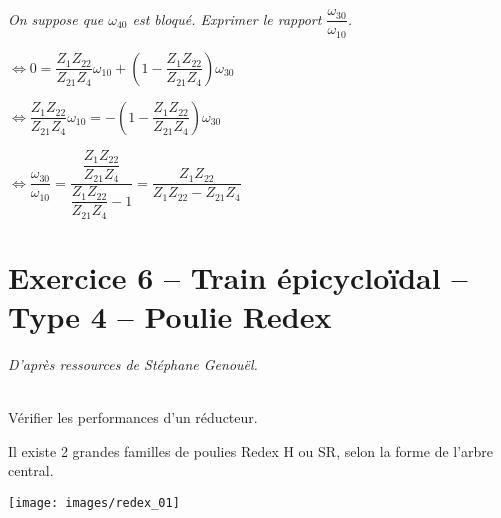 \documentclass[10pt,fleqn]{article} %
\begin{document}
\begin{multicols}{2}
\begin{multicols}{2}
\begin{corrige}
 \end{corrige}
 \else
 \fi
 
\subparagraph{}
\textit{On suppose que $\omega_{40}$ est bloqué. Exprimer le rapport $\dfrac{\omega_{30}}{\omega_{10}}$.}
\ifprof
 \begin{corrige}
 $\Leftrightarrow 0=\dfrac{Z_{1}Z_{22}}{Z_{21}Z_{4}}\omega_{10} +\left(1- \dfrac{Z_{1}Z_{22}}{Z_{21}Z_{4}}\right)\omega_{30}$

$\Leftrightarrow  \dfrac{Z_{1}Z_{22}}{Z_{21}Z_{4}}\omega_{10} =-\left(1- \dfrac{Z_{1}Z_{22}}{Z_{21}Z_{4}}\right)\omega_{30}$

$\Leftrightarrow  \dfrac{\omega_{30}}{\omega_{10}} = \dfrac{ \dfrac{Z_{1}Z_{22}}{Z_{21}Z_{4}}}{ \dfrac{Z_{1}Z_{22}}{Z_{21}Z_{4}}-1}= \dfrac{ {Z_{1}Z_{22}}}{ {Z_{1}Z_{22}}-Z_{21}Z_{4}}$
 \end{corrige}
 \else
 \fi

%

\section*{Exercice 6 -- Train épicycloïdal -- Type 4 -- Poulie Redex}
\setcounter{exo}{0}

\textit{D'après ressources de Stéphane Genouël.}


\begin{obj}~\\
Vérifier les performances d'un réducteur.
\end{obj}

\ifprof
\else
Il existe 2 grandes familles de poulies Redex H ou SR, selon la forme de l’arbre central.


\begin{center}
\texttt{[image: images/redex\_01]}
\end{center}




\end{multicols}
\end{multicols}
\end{document}
